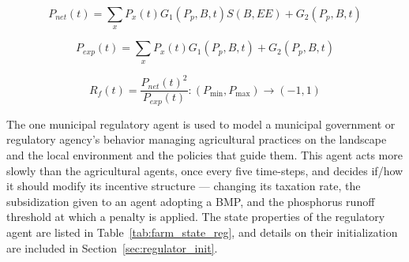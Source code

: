 \begin{equation}
\label{eq:f_netprofit}
    P_{net}(t) = \sum_x P_x(t) G_1(P_p, B, t) S(B, EE) + G_2(P_p, B, t)
\end{equation}

\begin{equation}
\label{eq:f_expprofit}
    P_{exp}(t) = \sum_x P_x(t) G_1(P_p, B, t) + G_2(P_p, B, t)
\end{equation}

\begin{equation}
\label{eq:f_farmreward}
    R_f(t) = 
    \frac{P_{net}(t)^2}{P_{exp}(t)} 
    : \left(P_{\min}, P_{\max}\right) \rightarrow \left(-1, 1\right)
\end{equation}

The one municipal regulatory agent is used to model a municipal 
government or regulatory agency's behavior managing agricultural 
practices on the landscape 
and the local environment and the policies that guide them. 
This agent acts more slowly than the agricultural agents, 
once every five time-steps, and decides if/how it should modify 
its incentive structure 
--- changing its taxation rate, the subsidization given to an agent 
adopting a BMP, and the phosphorus runoff threshold at which a penalty is 
applied.
The state properties of the regulatory agent are listed in
Table~\ref{tab:farm_state_reg},
and details on their initialization are included in
Section~\ref{sec:regulator_init}.

